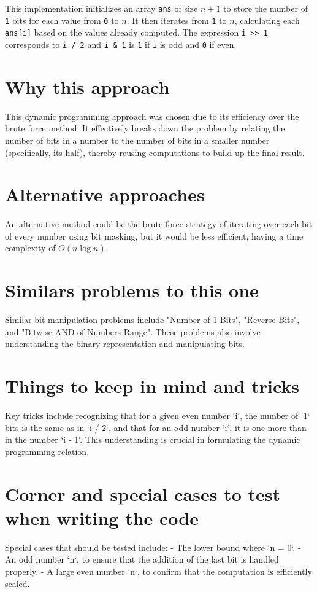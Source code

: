 This implementation initializes an array \texttt{ans} of size \(n + 1\) to store the number of \texttt{1} bits for each value from \texttt{0} to \(n\). It then iterates from \texttt{1} to \(n\), calculating each \texttt{ans[i]} based on the values already computed. The expression \texttt{i >> 1} corresponds to \texttt{i / 2} and \texttt{i \& 1} is \texttt{1} if \texttt{i} is odd and \texttt{0} if even.


\section*{Why this approach}
This dynamic programming approach was chosen due to its efficiency over the brute force method. It effectively breaks down the problem by relating the number of bits in a number to the number of bits in a smaller number (specifically, its half), thereby reusing computations to build up the final result.

\section*{Alternative approaches}
An alternative method could be the brute force strategy of iterating over each bit of every number using bit masking, but it would be less efficient, having a time complexity of \(O(n\log n)\).

\section*{Similars problems to this one}
Similar bit manipulation problems include "Number of 1 Bits", "Reverse Bits", and "Bitwise AND of Numbers Range". These problems also involve understanding the binary representation and manipulating bits.

\section*{Things to keep in mind and tricks}
Key tricks include recognizing that for a given even number `i`, the number of `1` bits is the same as in `i / 2`, and that for an odd number `i`, it is one more than in the number `i - 1`. This understanding is crucial in formulating the dynamic programming relation.

\section*{Corner and special cases to test when writing the code}
Special cases that should be tested include:
- The lower bound where `n = 0`.
- An odd number `n`, to ensure that the addition of the last bit is handled properly.
- A large even number `n`, to confirm that the computation is efficiently scaled.